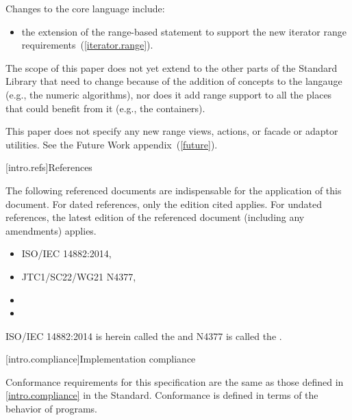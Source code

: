 \pnum
Changes to the core language include:

\begin{itemize}
\item the extension of the range-based  statement to support
the new iterator range requirements~(\ref{iterator.range}).
\end{itemize}


\pnum
The scope of this paper does not yet extend to the other parts of the Standard Library
that need to change because of the addition of concepts to the langauge (e.g., the numeric
algorithms), nor does it add range support to all the places that could benefit from it (e.g.,
the containers).

\pnum
This paper does not specify any new range views, actions, or facade or adaptor
utilities. See the Future Work appendix~(\ref{future}).

[intro.refs]{References}

\pnum
The following referenced documents are indispensable for the
application of this document. For dated references, only the
edition cited applies. For undated references, the latest edition
of the referenced document (including any amendments) applies.

\begin{itemize}
\item ISO/IEC 14882:2014, 
\item JTC1/SC22/WG21 N4377, 
\item {}
\item {}
\end{itemize}

ISO/IEC 14882:2014 is herein called the  and N4377 is called the .

[intro.compliance]{Implementation compliance}

\pnum
Conformance requirements for this specification are the same as those
defined in \ref{intro.compliance} in the \Cpp Standard.
\enternote
Conformance is defined in terms of the behavior of programs.
\exitnote

